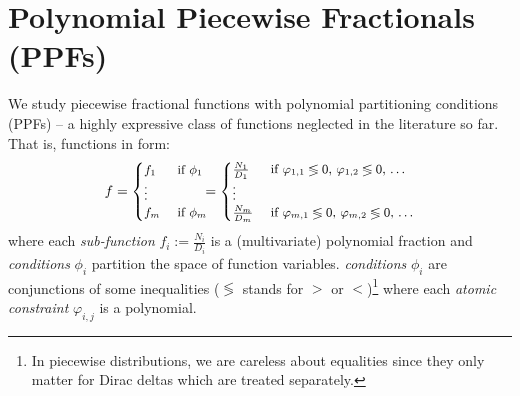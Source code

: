 \documentclass[]{article}
\newcommand{\bvec}[1]{\textbf{#1}}
\newcommand{\case}[2]{#2 &\text{ if } #1}%
\begin{document}
\section{Polynomial Piecewise Fractionals 
(PPFs)}
\label{sect:ppfs}
We study piecewise fractional functions with polynomial partitioning conditions (PPFs) -- a highly expressive class of functions neglected in the literature so far.
That is, functions in form:
\begin{equation}\footnotesize
\label{e:ppf}
f = 
  \begin{cases}
  \case{\phi_1}{f_1}\\
\vdots\\
  \case{\phi_m}{f_m}    
  \end{cases}
\!\!\!=
  \begin{cases}
  \case{\varphi_{1,1} \lessgtr 0,\, \varphi_{1,2} \lessgtr 0,\, \ldots}{\frac{N_1}{D_1}} \\
\vdots\\
   \case{\varphi_{m,1} \lessgtr 0,\, \varphi_{m,2} \lessgtr 0,\, \ldots}{\frac{N_m}{D_m}}    
  \end{cases}
\end{equation}
where each \emph{sub-function} $f_i := \frac{N_i}{D_i}$ is a (multivariate) polynomial fraction and
\emph{conditions} $\phi_i$ partition the space of function variables. 
\emph{conditions} $\phi_i$ are conjunctions of some inequalities ($\lessgtr$ stands for  
$>$ or $<$)\footnote{In piecewise distributions,  
we are careless about equalities since they only matter for Dirac deltas which are treated separately.
} 
where each \emph{atomic constraint} $\varphi_{i,j}$ is a polynomial.
\end{document}
